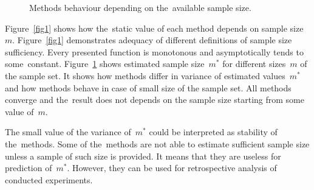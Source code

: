 \documentclass[
11pt,%
tightenlines,%
twoside,%
onecolumn,%
nofloats,%
nobibnotes,%
nofootinbib,%
superscriptaddress,%
noshowpacs,%
centertags]%
{revtex4}
\begin{document}
\begin{figure}[!hbp]
 \caption{Methods behaviour depending on the~available sample size.}
\label{fig2}
\end{figure}

Figure~\ref{fig1} shows how the~static value of each method depends on sample size~$m$. %
Figure~\ref{fig1} demonstrates adequacy of different definitions of sample size sufficiency. Every presented function is monotonous and asymptotically tends to some~constant. Figure~\ref{fig2} shows estimated sample size~$m^*$ for  different sizes~$m$ of the sample set. It shows how methods differ in variance  of estimated values~$m^*$ and how methods behave in case of small size of the sample set. All methods converge and the~result does not depends on the sample size starting from some value of~$m$. 


 
The small value of the variance of~$m^*$ could be interpreted as stability of the~methods. 
Some of the~methods are not able to estimate sufficient sample size unless a sample of  such size is provided. It means that they are useless for prediction of~$m^*$. However, they can be used for retrospective analysis of conducted experiments.
\end{document}
